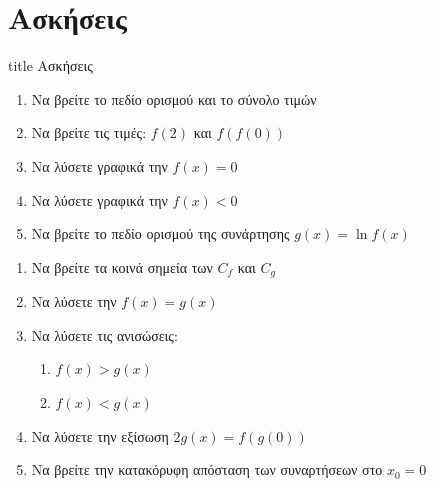 \documentclass{presentation}
\begin{document}
\section{Ασκήσεις}

\begin{frame}[noframenumbering]
  \vfill
  \centering
  \begin{beamercolorbox}[sep=8pt,center,shadow=true,rounded=true]{title}
    Ασκήσεις
  \end{beamercolorbox}
  \vfill
\end{frame}

\begin{askisi}
  \href{https://www.geogebra.org/m/jmmx7bp8}{}
  \begin{enumerate}[<+->]
    \item Να βρείτε το πεδίο ορισμού και το σύνολο τιμών
    \item Να βρείτε τις τιμές: $f(2)$ και $f(f(0))$
    \item Να λύσετε γραφικά την $f(x)=0$
    \item Να λύσετε γραφικά την $f(x)<0$
    \item Να βρείτε το πεδίο ορισμού της συνάρτησης $g(x)=\ln f(x)$
  \end{enumerate}
\end{askisi}

\begin{askisi}
  \href{https://www.geogebra.org/m/td6m58hw}{}
  \begin{enumerate}
    \item<1-> Να βρείτε τα κοινά σημεία των $C_f$ και $C_g$
    \item<2-> Να λύσετε την $f(x)=g(x)$
    \item<3-> Να λύσετε τις ανισώσεις:
          \begin{enumerate}
            \item<4-> $f(x)>g(x)$
            \item<5-> $f(x)<g(x)$
          \end{enumerate}
    \item<6-> Να λύσετε την εξίσωση $2g(x)=f(g(0))$
    \item<7-> Να βρείτε την κατακόρυφη απόσταση των συναρτήσεων στο $x_0=0$
  \end{enumerate}
\end{askisi}
\end{document}
